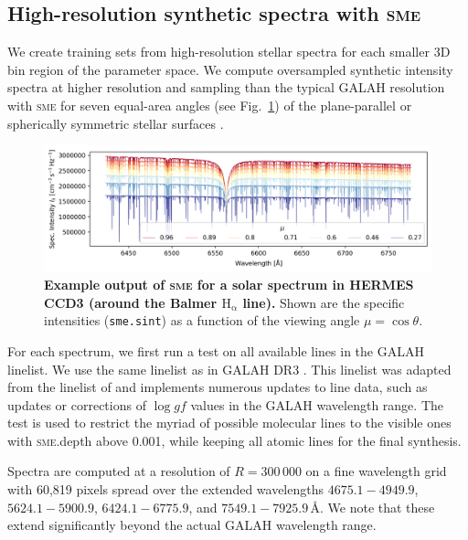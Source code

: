 \documentclass[
  journal=pasa,
  manuscript=research-paper, %
  year=2024,
  volume=37
]{cup-journal}
\newcommand{\sme}{\textsc{sme}\xspace}
\newcommand{\Angstroem}{\,\text{\AA}}	%
\begin{document}
\subsection{High-resolution synthetic spectra with \sme}
\label{sec:higher_resolution_synthetic_spectra}

We create training sets from high-resolution stellar spectra for each smaller 3D bin region of the parameter space. We compute oversampled synthetic intensity spectra at higher resolution and sampling than the typical GALAH resolution with \sme for seven equal-area angles (see Fig.~\ref{fig:sme_mu_output}) of the plane-parallel or spherically symmetric stellar surfaces \citep{Gustafsson2008}.

\begin{figure}[ht]
 \centering
 \includegraphics[width=\textwidth]{figures/solar_twin_specific_intensity.png}
 \caption{\textbf{Example output of \sme for a solar spectrum in HERMES CCD3 (around the Balmer $\mathrm{H}_\upalpha$ line).} Shown are the specific intensities (\texttt{sme.sint}) as a function of the viewing angle $\mu = \cos \theta$. }
 \label{fig:sme_mu_output}
\end{figure}

For each spectrum, we first run a test on all available lines in the GALAH linelist. We use the same linelist as in GALAH DR3 \citep{Buder2021}. This linelist was adapted from the linelist of \citet{Heiter2021} and implements numerous updates to line data, such as updates or corrections of $\log gf$ values in the GALAH wavelength range. The test is used to restrict the myriad of possible molecular lines to the visible ones with \textsc{sme}.depth above 0.001, while keeping all atomic lines for the final synthesis.

Spectra are computed at a resolution of $R = 300\,000$ on a fine wavelength grid with 60,819 pixels spread over the extended wavelengths $4675.1-4949.9$, $5624.1-5900.9$, $6424.1-6775.9$, and $7549.1-7925.9 \Angstroem$. We note that these extend significantly beyond the actual GALAH wavelength range.
\end{document}
